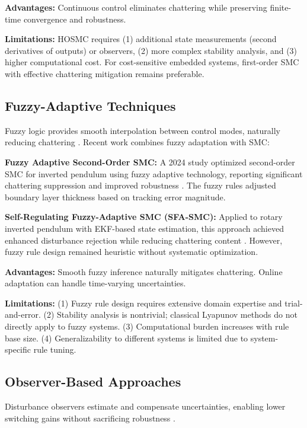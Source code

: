 \textbf{Advantages:} Continuous control eliminates chattering while preserving finite-time convergence and robustness.

\textbf{Limitations:} HOSMC requires (1) additional state measurements (second derivatives of outputs) or observers, (2) more complex stability analysis, and (3) higher computational cost. For cost-sensitive embedded systems, first-order SMC with effective chattering mitigation remains preferable.

\subsection{Fuzzy-Adaptive Techniques}

Fuzzy logic provides smooth interpolation between control modes, naturally reducing chattering \cite{palm1992fuzzy}. Recent work combines fuzzy adaptation with SMC:

\textbf{Fuzzy Adaptive Second-Order SMC:} A 2024 study optimized second-order SMC for inverted pendulum using fuzzy adaptive technology, reporting significant chattering suppression and improved robustness \cite{frontiers2024fuzzy}. The fuzzy rules adjusted boundary layer thickness based on tracking error magnitude.

\textbf{Self-Regulating Fuzzy-Adaptive SMC (SFA-SMC):} Applied to rotary inverted pendulum with EKF-based state estimation, this approach achieved enhanced disturbance rejection while reducing chattering content \cite{sfa2024rotary}. However, fuzzy rule design remained heuristic without systematic optimization.

\textbf{Advantages:} Smooth fuzzy inference naturally mitigates chattering. Online adaptation can handle time-varying uncertainties.

\textbf{Limitations:} (1) Fuzzy rule design requires extensive domain expertise and trial-and-error. (2) Stability analysis is nontrivial; classical Lyapunov methods do not directly apply to fuzzy systems. (3) Computational burden increases with rule base size. (4) Generalizability to different systems is limited due to system-specific rule tuning.

\subsection{Observer-Based Approaches}

Disturbance observers estimate and compensate uncertainties, enabling lower switching gains without sacrificing robustness \cite{chen2000disturbance}.

